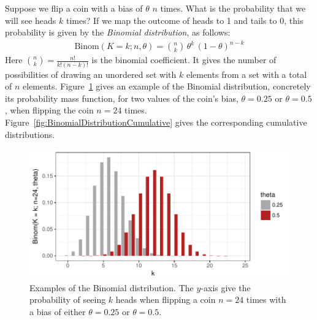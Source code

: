 \documentclass[nobib,nofonts]{tufte-handout}
\renewcommand{\markdef}[1]{\emph{#1}}
\begin{document}
\begin{example}
  Suppose we flip a coin with a bias of $\theta$ $n$ times. What is the probability that we
  will see heads $k$ times? If we map the outcome of heads to 1 and tails to 0, this
  probability is given by the \markdef{Binomial distribution}, as follows:
  \begin{align*}
    \text{Binom}(K = k ; n, \theta) = \binom{n}{k} \,  \theta^{k} \, (1-\theta)^{n-k}
  \end{align*}
  Here $\binom{n}{k} = \frac{n!}{k!(n-k)!}$ is the binomial coefficient.
  It gives the number of possibilities of drawing an unordered set with $k$ elements from a set with a total of $n$ elements.
  Figure~\ref{fig:BinomialDistribution} gives an example of the Binomial distribution, concretely its probability mass function, for two values of the coin's bias, $\theta = 0.25$ or $\theta = 0.5$, when flipping the coin $n=24$ times.
  Figure~\ref{fig:BinomialDistributionCumulative} gives the corresponding cumulative distributions.

\begin{figure}
  \centering
  \includegraphics[width=\textwidth]{00-pics/05_00_binomial-distribution.pdf}
  \caption{Examples of the Binomial distribution. The $y$-axis give the probability of seeing
    $k$ heads when flipping a coin $n=24$ times with a bias of either $\theta = 0.25$ or
    $\theta = 0.5$.}
  \label{fig:BinomialDistribution}
\end{figure}


\end{example}
\end{document}
